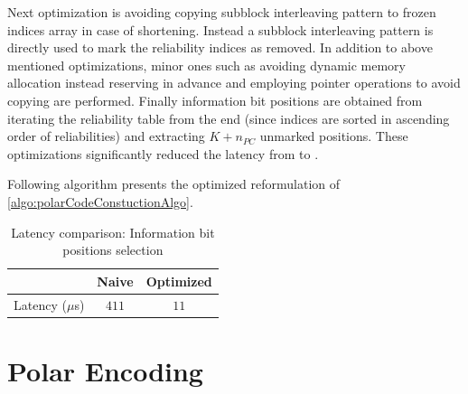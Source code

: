 
Next optimization is avoiding copying subblock interleaving pattern to frozen indices array in case of shortening. Instead a subblock interleaving pattern is directly used to mark the reliability indices as removed. In addition to above mentioned optimizations, minor ones such as avoiding dynamic memory allocation instead reserving in advance and employing pointer operations to avoid copying are performed. Finally information bit positions are obtained from iterating the reliability table from the end (since indices are sorted in ascending order of reliabilities) and extracting $K+n_{PC}$ unmarked positions. These optimizations significantly reduced the latency from  to .

Following algorithm presents the optimized reformulation of \ref{algo:polarCodeConstuctionAlgo}.


\begin{table}[]
	\begin{center}
		\caption{Latency comparison: Information bit positions selection}
		\label{tab:codeConstrLatency}
		\begin{tabular}{c|c|c} %
			\textbf{ } & Naive & Optimized \\
			\hline
			Latency ($\mu$s) & $411$ & $11$\\
		\end{tabular}
	\end{center}
\end{table}


\section{Polar Encoding}

